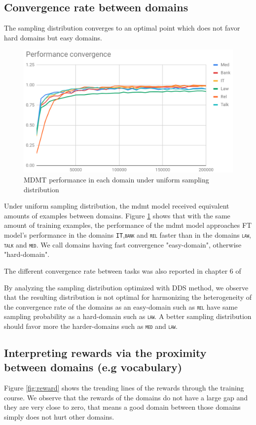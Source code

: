 \documentclass[12pt,times,a4paper,twoside]{article}
\newcommand{\domain}[1]{\texttt{\textsc{#1}}}
\theoremstyle{definition}
\begin{document}
\subsection{Convergence rate between domains}
The sampling distribution converges to an optimal point which does not favor hard domains but easy domains. 
\begin{figure}[h!]
\includegraphics[width=\linewidth]{517.png}
\caption{MDMT performance in each domain under uniform sampling distribution}
\label{fig:uniform}
\end{figure}
Under uniform sampling distribution, the mdmt model received equivalent amounts of examples between domains. Figure \ref{fig:uniform} shows that with the same amount of training examples, the performance of the mdmt model approaches FT model's performance in the domains \domain{IT},\domain{bank} and \domain{rel} faster than in the domains \domain{law}, \domain{talk} and \domain{med}. We call domains having fast convergence "easy-domain", otherwise "hard-domain".

The different convergence rate between tasks was also reported in chapter 6 of \cite{Caruana97multitask}

By analyzing the sampling distribution optimized with DDS method, we observe that the resulting distribution is not optimal for harmonizing the heterogeneity of the convergence rate of the domains as an easy-domain such as \domain{rel} have same sampling probability as a hard-domain such as \domain{law}. A better sampling distribution should favor more the harder-domains such as \domain{med} and \domain{law}.

\subsection{Interpreting rewards via the proximity between domains (e.g vocabulary)}
Figure \ref{fig:reward} shows the trending lines of the rewards through the training course. We observe that the rewards of the domains do not have a large gap and they are very close to zero, that means a good domain between those domains simply does not hurt other domains.
\end{document}
